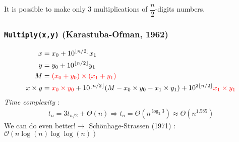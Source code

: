 \documentclass[12pt,a4paper]{report}
\theoremstyle{break}
\begin{document}
It is possible to make only 3 multiplications of $\dfrac{n}{2}$-digits numbers.
\subsubsection*{\texttt{Multiply(x,y)} \textmd{(Karastuba-Ofman, 1962)}}
\begin{align*}
x&=x_0+10^{\lfloor n/2 \rfloor}x_1\\
y&=y_0+10^{\lfloor n/2 \rfloor}y_1\\
M&=\color{red} (x_0+y_0)\times (x_1+y_1)\\
x\times y&={\color{red}x_0\times y_0}+10^{\lfloor n/2 \rfloor}(M-x_0\times y_0-x_1\times y_1)+10^{2\lfloor n/2 \rfloor}{\color{red} x_1\times y_1}
\end{align*}
\emph{Time complexity} : 
\begin{align*}
t_n=3t_{n/2}+\Theta (n) \Rightarrow t_n=\Theta\left(n^{\log_2 3}\right)\approx \Theta\left(n^{1.585}\right)
\end{align*}
We can do even better!$\rightarrow$ Schönhage-Strassen (1971) : $\mathcal{O}(n\log(n)\log\log(n))$\\
\end{document}
